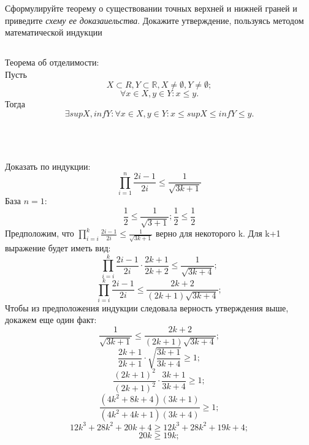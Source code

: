 Сформулируйте теорему о существовании точных верхней и нижней граней и приведите \textit{схему ее доказаиельства}. Докажите утверждение, пользуясь методом математической индукции

\subsection{}
	Теорема об отделимости:\\
	Пусть $$X \subset R, Y\subset \mathbb{R}, X \neq \emptyset, Y\neq\emptyset;$$
	$$\forall x\in X, y\in Y: x\leq y.$$
	Тогда $$\exists supX, infY: \forall x\in X, y\in Y: x\leq supX\leq infY\leq y.$$
	\\\\
\subsection{}
	Доказать по индукции: $$\prod_{i=1}^n\frac{2i - 1}{2i}\leq\frac{1}{\sqrt{3k+1}}$$
	База $n = 1$:
	$$\frac{1}{2}\leq\frac{1}{\sqrt{3+1}}; \frac{1}{2}\leq\frac{1}{2}$$
	Предположим, что $\prod_{i=i}^{k}\frac{2i - 1}{2i}\leq\frac{1}{\sqrt{3k+1}}$ верно для некоторого k. Для k+1 выражение будет иметь вид:
	$$\prod_{i=i}^{k}\frac{2i - 1}{2i}\cdot\frac{2k + 1}{2k+2}\leq\frac{1}{\sqrt{3k+4}};$$
	$$\prod_{i=i}^{k}\frac{2i - 1}{2i}\leq\frac{2k + 2}{(2k+1)\sqrt{3k+4}};$$
	Чтобы из предположения индукции следовала верность утверждения выше, докажем еще один факт:
	$$\frac{1}{\sqrt{3k+1}}\leq\frac{2k + 2}{(2k+1)\sqrt{3k+4}};$$
	$$\frac{2k+1}{2k+1}\cdot\sqrt{\frac{3k + 1}{3k+4}}\geq 1;$$
	$$\frac{(2k+1)^2}{(2k+1)^2}\cdot\frac{3k + 1}{3k+4}\geq 1;$$
	$$\frac{(4k^2+8k+4)(3k+1)}{(4k^2+4k+1)(3k+4)}\geq 1;$$
	$$12k^3+28k^2+20k+4\geq 12k^3+28k^2+19k+4;$$
	$$20k\geq 19k;$$
	\\\\
